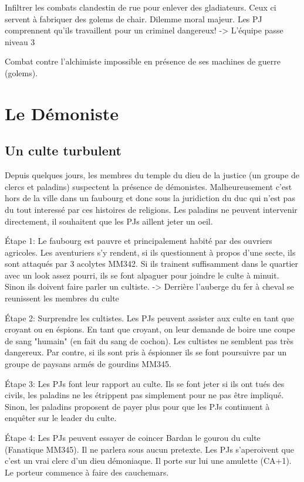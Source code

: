 Infiltrer les combats clandestin de rue pour enlever des gladiateurs. Ceux ci servent à fabriquer
des golems de chair. Dilemme moral majeur. Les PJ comprennent qu'ils travaillent pour un criminel
dangereux!
 -> L'équipe passe niveau 3

Combat contre l'alchimiste impossible en présence de ses machines de guerre (golems).

\section{Le Démoniste}
\label{Demoniste}

\subsection{Un culte turbulent}

Depuis quelques jours, les membres du temple du dieu de la justice (un groupe de clercs et paladins) 
suspectent la présence de démonistes. Malheureusement c'est hors de la ville dans un faubourg 
et donc sous la juridiction du duc qui n'est pas du tout interessé par ces histoires de religions.
Les paladins ne peuvent intervenir directement, il souhaitent que les PJs aillent jeter un oeil.

Étape 1: Le faubourg est pauvre et principalement habité par des ouvriers agricoles. Les aventuriers
s'y rendent, si ils questionnent à propos d'une secte, ils sont attaqués par 3 acolytes MM342. Si ils
trainent suffisamment dans le quartier avec un look assez pourri, ils se font alpaguer pour joindre le 
culte à minuit. Sinon ils doivent faire parler un cultiste.
-> Derrière l'auberge du fer à cheval se reunissent les membres du culte

Étape 2: Surprendre les cultistes. Les PJs peuvent assister aux culte en tant que croyant ou en éspions.
En tant que croyant, on leur demande de boire une coupe de sang "humain" (en fait du sang de cochon).
Les cultistes ne semblent pas très dangereux. Par contre, si ils sont pris à éspionner ils se font 
poursuivre par un groupe de paysans armés de gourdins MM345.

Étape 3: Les PJs font leur rapport au culte. Ils se font jeter si ils ont tués des civils, les paladins ne 
les étrippent pas simplement pour ne pas être impliqué. Sinon, les paladins proposent de payer plus pour 
que les PJs continuent à enquêter sur le leader du culte.

Étape 4: Les PJs peuvent essayer de coincer Bardan le gourou du culte (Fanatique MM345). Il ne parlera
sous aucun pretexte. Les PJs s'aperoivent que c'est un vrai clerc d'un dieu démoniaque. Il porte sur lui 
une amulette (CA+1). Le porteur commence à faire des cauchemars.

